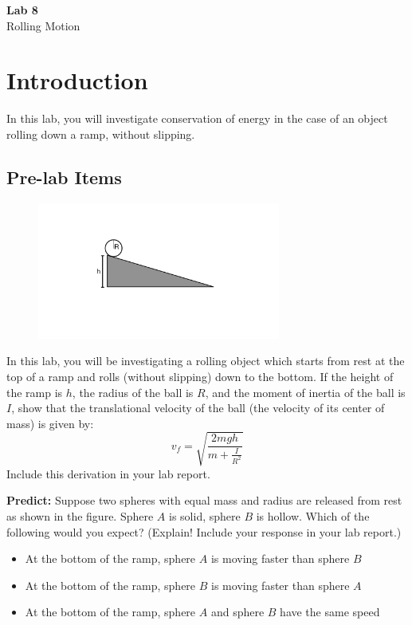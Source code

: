 \documentclass{article}
\begin{document}
\fancyfoot[C]{\thepage}
\vspace*{0cm}
\begin{center}
	{\LARGE \textbf{Lab 8}}\\
	\vspace{.25cm}
	{\Large Rolling Motion}
\end{center}

\section*{Introduction}
In this lab, you will investigate conservation of energy in the case of an object rolling down a ramp, without slipping.
\subsection*{Pre-lab Items}
\begin{figure}[ht!]
	\begin{center}
		\includegraphics[width=8cm]{rolling_motion.pdf}
	\end{center}
\end{figure}
In this lab, you will be investigating a rolling object which starts from rest at the top of a ramp and rolls (without slipping) down to the bottom. If the height of the ramp is $h$, the radius of the ball is $R$, and the moment of inertia of the ball is $I$, show that the translational velocity of the ball (the velocity of its center of mass) is given by:
\begin{equation}
	v_f=\sqrt{\frac{2mgh}{m+\frac{I}{R^2}}}
	\label{eqn}
\end{equation}
Include this derivation in your lab report.

\textbf{Predict:} Suppose two spheres with equal mass and radius are released from rest as shown in the figure. Sphere $A$ is solid, sphere $B$ is hollow. Which of the following would you expect? (Explain! Include your response in your lab report.)
\begin{itemize}
	\item At the bottom of the ramp, sphere $A$ is moving faster than sphere $B$
	\item At the bottom of the ramp, sphere $B$ is moving faster than sphere $A$
	\item At the bottom of the ramp, sphere $A$ and sphere $B$ have the same speed
\end{itemize}
\end{document}
